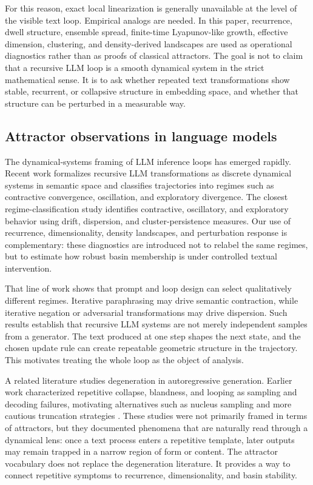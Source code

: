 \documentclass{article}
\theoremstyle{plain}
\theoremstyle{definition}
\begin{document}
For this reason, exact local linearization is generally unavailable at the level of the visible text loop. Empirical analogs are needed. In this paper, recurrence, dwell structure, ensemble spread, finite-time Lyapunov-like growth, effective dimension, clustering, and density-derived landscapes are used as operational diagnostics rather than as proofs of classical attractors. The goal is not to claim that a recursive LLM loop is a smooth dynamical system in the strict mathematical sense. It is to ask whether repeated text transformations show stable, recurrent, or collapsive structure in embedding space, and whether that structure can be perturbed in a measurable way.

\subsection{Attractor observations in language models}

The dynamical-systems framing of LLM inference loops has emerged rapidly. Recent work formalizes recursive LLM transformations as discrete dynamical systems in semantic space and classifies trajectories into regimes such as contractive convergence, oscillation, and exploratory divergence. The closest regime-classification study identifies contractive, oscillatory, and exploratory behavior using drift, dispersion, and cluster-persistence measures. Our use of recurrence, dimensionality, density landscapes, and perturbation response is complementary: these diagnostics are introduced not to relabel the same regimes, but to estimate how robust basin membership is under controlled textual intervention.

That line of work shows that prompt and loop design can select qualitatively different regimes. Iterative paraphrasing may drive semantic contraction, while iterative negation or adversarial transformations may drive dispersion. Such results establish that recursive LLM systems are not merely independent samples from a generator. The text produced at one step shapes the next state, and the chosen update rule can create repeatable geometric structure in the trajectory. This motivates treating the whole loop as the object of analysis.

A related literature studies degeneration in autoregressive generation. Earlier work characterized repetitive collapse, blandness, and looping as sampling and decoding failures, motivating alternatives such as nucleus sampling and more cautious truncation strategies \citep{holtzman2020,carlini2021}. These studies were not primarily framed in terms of attractors, but they documented phenomena that are naturally read through a dynamical lens: once a text process enters a repetitive template, later outputs may remain trapped in a narrow region of form or content. The attractor vocabulary does not replace the degeneration literature. It provides a way to connect repetitive symptoms to recurrence, dimensionality, and basin stability.
\end{document}
